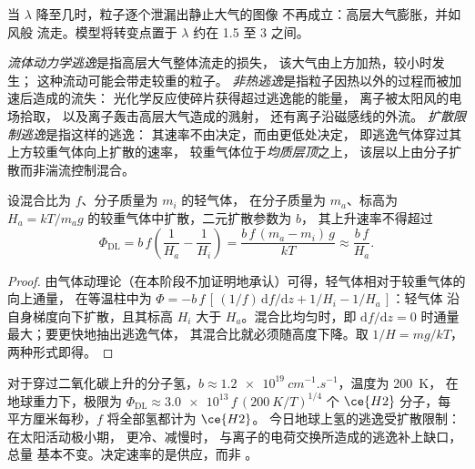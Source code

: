 当 $\lambda$ 降至几时，粒子逐个泄漏出静止大气的图像
不再成立：高层大气膨胀，并如风般
流走。模型将转变点置于 $\lambda$ 约在 1.5
至 3 之间。

\begin{definition}\label{def:b3:planetary-atmospheres:hydrodynamic}
\emph{流体动力学逃逸}是指高层大气整体流走的损失，
该大气由上方加热，较小时发生；
这种流动可能会带走较重的粒子。
\emph{非热逃逸}是指粒子因热以外的过程而被加速后造成的流失：
光化学反应使碎片获得超过逃逸能的能量，
离子被太阳风的电场拾取，
以及离子轰击高层大气造成的溅射，
还有离子沿磁感线的外流。
\emph{扩散限制逃逸}是指这样的逃逸：
其速率不由决定，而由更低处决定，
即逃逸气体穿过其上方较重气体向上扩散的速率，
较重气体位于\emph{均质层顶}之上，
该层以上由分子扩散而非湍流控制混合。
\end{definition}

\begin{proposition}[扩散极限]\label{prop:b3:planetary-atmospheres:diffusion}
设混合比为 $f$、分子质量为 $m_i$ 的轻气体，
在分子质量为 $m_a$、标高为 $H_a =
kT/m_a g$ 的较重气体中扩散，二元扩散参数为 $b$，
其上升速率不得超过
\[
\Phi_\mathrm{DL} = b\,f\left(\frac1{H_a} - \frac1{H_i}\right)
= \frac{b\,f\,(m_a - m_i)\,g}{kT} \approx \frac{b\,f}{H_a}.
\]
\end{proposition}

\begin{proof}
由气体动理论（在本阶段不加证明地承认）可得，轻气体相对于较重气体的向上通量，
在等温柱中为 $\Phi = -b\,f\,
[\,(1/f)\,\mathrm df/\mathrm dz + 1/H_i - 1/H_a\,]$：轻气体
沿自身梯度向下扩散，且其标高 $H_i$ 大于
$H_a$。混合比均匀时，即 $\mathrm
df/\mathrm dz = 0$ 时通量最大；要更快地抽出逃逸气体，
其混合比就必须随高度下降。取 $1/H = mg/kT$，
两种形式即得。
\end{proof}

对于穿过二氧化碳上升的分子氢，$b \approx
\qty{1.2e19}{cm^{-1}.s^{-1}}$，温度为 \qty{200}{K}，
在地球重力下，极限为 $\Phi_\mathrm{DL} \approx
\num{3.0e13}\,f\,(\qty{200}{K}/T)^{1/4}$ 个 $\ce{H2}$ 分子，每
平方厘米每秒，$f$ 将全部氢都计为 $\ce{H2}$。
今日地球上氢的逃逸受扩散限制：在太阳活动极小期，
更冷、减慢时，
与离子的电荷交换所造成的逃逸补上缺口，总量
基本不变。决定速率的是供应，而非
。

